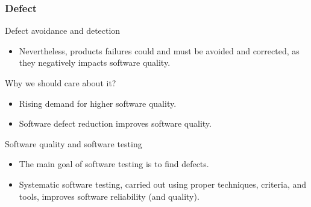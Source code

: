 \begin{frame}[hasprev=true, hasnext=false]
\frametitle{Defect}

\begin{block:fact}{Defect avoidance and detection}
\begin{itemize}
	\item Nevertheless, products failures could and must be avoided and
	corrected, as they negatively impacts software quality.
\end{itemize}
\end{block:fact}


\begin{block:fact}{Why we should care about it?}
\begin{itemize}
    \item Rising demand for higher software quality.

    \item Software defect reduction improves software quality.
\end{itemize}
\end{block:fact}

\begin{block:fact}{Software quality and software testing}
\begin{itemize}
	\item The main goal of software testing is to find defects.

	\item Systematic software testing, carried out using proper techniques,
	criteria, and tools, improves software reliability (and quality).
\end{itemize}
\end{block:fact}
\end{frame}
